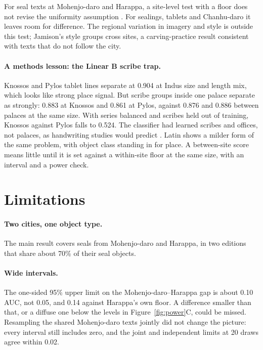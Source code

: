 \documentclass[11pt,a4paper]{article}
\begin{document}
For seal texts at Mohenjo-daro and Harappa, a site-level test with a floor does not revise the uniformity assumption \citep[p.~lvi]{kenoyer2010}.
For sealings, tablets and Chanhu-daro it leaves room for difference.
The regional variation in imagery and style \citep{ameri2013,jamison2017,petrie2018} is outside this test; Jamison's style groups cross sites, a carving-practice result consistent with texts that do not follow the city.

\paragraph{A methods lesson: the Linear B scribe trap.} Knossos and Pylos tablet lines separate at 0.904 at Indus size and length mix, which looks like strong place signal. %
But scribe groups inside one palace separate as strongly: 0.883 at Knossos and 0.861 at Pylos, against 0.876 and 0.886 between palaces at the same size. %
With series balanced and scribes held out of training, Knossos against Pylos falls to 0.524. %
The classifier had learned scribes and offices, not palaces, as handwriting studies would predict \citep[p.~296]{bennett1966}\citep{srivatsan2021}.
Latin shows a milder form of the same problem, with object class standing in for place.
A between-site score means little until it is set against a within-site floor at the same size, with an interval and a power check.

\section{Limitations}
\label{sec:limitations}

\paragraph{Two cities, one object type.} The main result covers seals from Mohenjo-daro and Harappa, in two editions that share about 70\% of their seal objects. %

\paragraph{Wide intervals.} The one-sided 95\% upper limit on the Mohenjo-daro--Harappa gap is about 0.10 AUC, not 0.05, and 0.14 against Harappa's own floor. %
A difference smaller than that, or a diffuse one below the levels in Figure~\ref{fig:power}C, could be missed.
Resampling the shared Mohenjo-daro texts jointly did not change the picture: every interval still includes zero, and the joint and independent limits at 20 draws agree within 0.02. %
\end{document}
